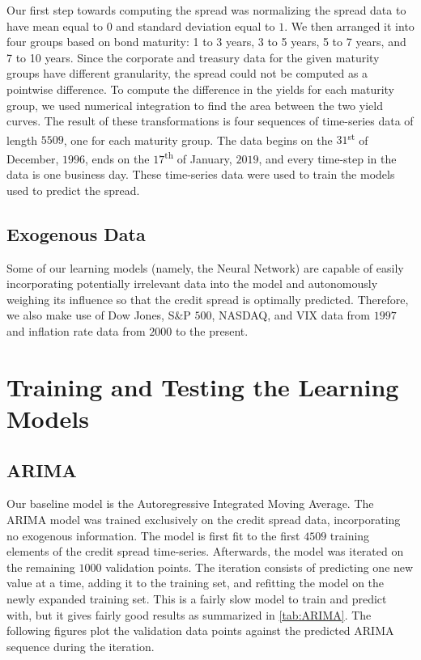 \documentclass[12pt]{article}
\begin{document}
        Our first step towards computing the spread was normalizing the spread data to have mean equal to $0$ and standard deviation equal to $1$.
        We then arranged it into four groups based on bond maturity: 1 to 3 years, 3 to 5 years, 5 to 7 years, and 7 to 10 years.
        Since the corporate and treasury data for the given maturity groups have different granularity, the spread could not be computed as a pointwise difference.
        To compute the difference in the yields for each maturity group, we used numerical integration to find the area between the two yield curves.
        The result of these transformations is four sequences of time-series data of length $5509$, one for each maturity group.
        The data begins on the $31$\textsuperscript{st} of December, $1996$, ends on the $17$\textsuperscript{th} of January, $2019$,
        and every time-step in the data is one business day.
        These time-series data were used to train the models used to predict the spread.

    \subsection{Exogenous Data}
        Some of our learning models (namely, the Neural Network) are capable of easily incorporating potentially irrelevant data into the model
        and autonomously weighing its influence so that the credit spread is optimally predicted.
        Therefore, we also make use of Dow Jones, S\&P $500$, NASDAQ, and VIX data from $1997$ and inflation rate data from $2000$ to the present.

\section{Training and Testing the Learning Models}
    \subsection{ARIMA}
        Our baseline model is the Autoregressive Integrated Moving Average.
        The ARIMA model was trained exclusively on the credit spread data, incorporating no exogenous information.
        The model is first fit to the first $4509$ training elements of the credit spread time-series.
        Afterwards, the model was iterated on the remaining $1000$ validation points.
        The iteration consists of predicting one new value at a time, adding it to the training set, and refitting the model on the newly expanded training set.
        This is a fairly slow model to train and predict with, but it gives fairly good results as summarized in \autoref{tab:ARIMA}.
        The following figures plot the validation data points against the predicted ARIMA sequence during the iteration.
\end{document}

